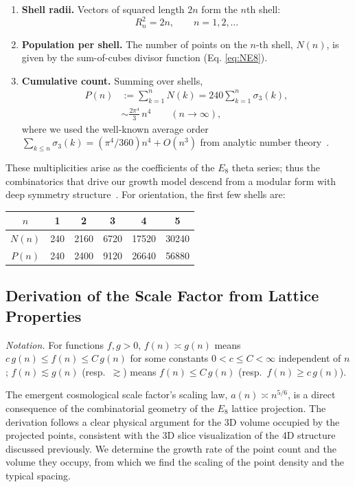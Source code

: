 \documentclass[universe,article,submit,pdftex,moreauthors]{Definitions/mdpi}
\begin{document}
\begin{enumerate}
 \item \textbf{Shell radii.} Vectors of squared length $2n$ form the $n$th shell:
 \begin{equation}
 R_n^2 = 2n, \qquad n=1,2,\ldots
 \end{equation}

 \item \textbf{Population per shell.} The number of points on the $n$-th shell, $N(n)$, is given by the sum-of-cubes divisor function (Eq. \ref{eq:NE8}).

 \item \textbf{Cumulative count.} Summing over shells,
 \begin{align}
 P(n) &:= \sum_{k=1}^{n} N(k) = 240 \sum_{k=1}^{n} \sigma_3(k), \\
&\sim \frac{2\pi^4}{3}\,n^4 \qquad (n\to\infty), \label{eq:Pn-asymp}
 \end{align}
 where we used the well-known average order $\sum_{k\le n} \sigma_3(k) = (\pi^4/360)n^4 + O(n^3)$ from analytic number theory~\cite{Apostol1976}.
\end{enumerate}

These multiplicities arise as the coefficients of the $E_8$ theta series; thus the combinatorics that drive our growth model descend from a modular form with deep symmetry structure~\cite{Viazovska2017}.
For orientation, the first few shells are:
\begin{center}
\begin{tabular}{c|ccccc}
$n$ & 1 & 2 & 3 & 4 & 5 \\ \hline
$N(n)$ & 240 & 2160 & 6720 & 17520 & 30240 \\
$P(n)$ & 240 & 2400 & 9120 & 26640 & 56880 \\
\end{tabular}
\end{center}

\subsection{Derivation of the Scale Factor from Lattice Properties}
\label{subsec:Derivation}

\noindent\textit{Notation.} For functions $f,g>0$, $f(n)\asymp g(n)$ means $c\,g(n)\le f(n)\le C\,g(n)$ for some constants $0<c\le C<\infty$ independent of $n$; $f(n)\lesssim g(n)$ (resp.\ $\gtrsim$) means $f(n)\le C\,g(n)$ (resp.\ $f(n)\ge c\,g(n)$).

The emergent cosmological scale factor's scaling law, $a(n) \asymp n^{5/6}$, is a direct consequence of the combinatorial geometry of the $E_8$ lattice projection. The derivation follows a clear physical argument for the 3D volume occupied by the projected points, consistent with the 3D slice visualization of the 4D structure discussed previously. We determine the growth rate of the point count and the volume they occupy, from which we find the scaling of the point density and the typical spacing.
\end{document}
